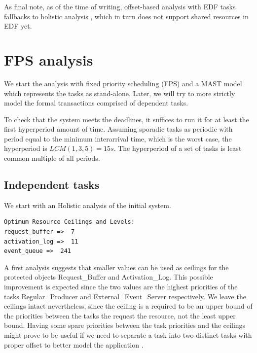 \documentclass{article}
\begin{document}
As final note, as of the time of writing, offset-based analysis with EDF tasks fallbacks to holistic analysis \cite{mast-analysis}, which in turn does not support shared resources in EDF yet.

\section{FPS analysis}

We start the analysis with fixed priority scheduling (FPS) and a MAST model which represents the tasks as stand-alone. Later, we will try to more strictly model the formal transactions comprised of dependent tasks.

To check that the system meets the deadlines, it suffices to run it for at least the first hyperperiod amount of time. Assuming sporadic tasks as periodic with period equal to the minimum interarrival time, which is the worst case, the hyperperiod is $LCM(1, 3, 5) = 15s$. The hyperperiod of a set of tasks is least common multiple of all periods.

\subsection{Independent tasks}

We start with an Holistic analysis of the initial system.

\begin{lstlisting}
Optimum Resource Ceilings and Levels:
request_buffer =>  7
activation_log =>  11
event_queue =>  241
\end{lstlisting}

A first analysis suggests that smaller values can be used as ceilings for the protected objects Request\_Buffer and Activation\_Log. This possible improvement is expected since the two values are the highest priorities of the tasks Regular\_Producer and External\_Event\_Server respectively. We leave the ceilings intact nevertheless, since the ceiling is a required to be an upper bound of the priorities between the tasks the request the resource, not the least upper bound. Having some spare priorities between the task priorities and the ceilings might prove to be useful if we need to separate a task into two distinct tasks with proper offset to better model the application \cite{tindell-offsets}.
\end{document}
